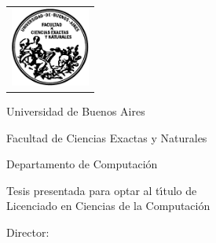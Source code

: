 \newcommand{\HRule}{\rule{\linewidth}{0.2mm}}
%
\thispagestyle{empty}

\begin{center}\leavevmode

\vspace{-2cm}

\begin{tabular}{l}
\includegraphics[width=2.6cm]{img/logofcen.pdf}
\end{tabular}


{\large \sc Universidad de Buenos Aires

Facultad de Ciencias Exactas y Naturales

Departamento de Computación}

\vspace{6.0cm}


{\huge\bf \tituloTesis}

\vspace{2cm}

{\large Tesis presentada para optar al t\'{\i}tulo de\\
Licenciado en Ciencias de la Computación}

\vspace{2cm}

{\Large \autor}

\end{center}

\vfill

{\large

{Director: \director}



\vspace{.2cm}

\lugar
}

\newpage\thispagestyle{empty}
